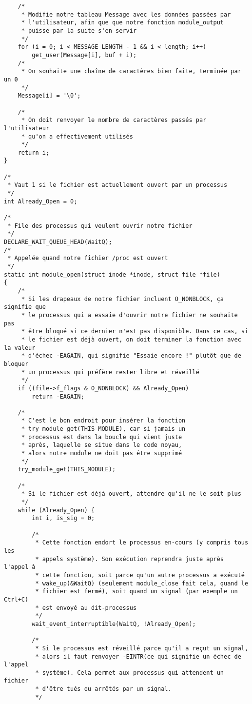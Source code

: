 \documentclass[11pt]{article}
\begin{document}
\begin{verbatim}
    /*
     * Modifie notre tableau Message avec les données passées par
     * l'utilisateur, afin que que notre fonction module_output
     * puisse par la suite s'en servir
     */
    for (i = 0; i < MESSAGE_LENGTH - 1 && i < length; i++)
        get_user(Message[i], buf + i);
    /*
     * On souhaite une chaîne de caractères bien faite, terminée par un 0
     */
    Message[i] = '\0';

    /*
     * On doit renvoyer le nombre de caractères passés par l'utilisateur
     * qu'on a effectivement utilisés
     */
    return i;
}

/*
 * Vaut 1 si le fichier est actuellement ouvert par un processus
 */
int Already_Open = 0;

/*
 * File des processus qui veulent ouvrir notre fichier
 */
DECLARE_WAIT_QUEUE_HEAD(WaitQ);
/*
 * Appelée quand notre fichier /proc est ouvert
 */
static int module_open(struct inode *inode, struct file *file)
{
    /*
     * Si les drapeaux de notre fichier incluent O_NONBLOCK, ça signifie que
     * le processus qui a essaie d'ouvrir notre fichier ne souhaite pas
     * être bloqué si ce dernier n'est pas disponible. Dans ce cas, si
     * le fichier est déjà ouvert, on doit terminer la fonction avec la valeur
     * d'échec -EAGAIN, qui signifie "Essaie encore !" plutôt que de bloquer
     * un processus qui préfère rester libre et réveillé
     */
    if ((file->f_flags & O_NONBLOCK) && Already_Open)
        return -EAGAIN;

    /*
     * C'est le bon endroit pour insérer la fonction
     * try_module_get(THIS_MODULE), car si jamais un
     * processus est dans la boucle qui vient juste
     * après, laquelle se situe dans le code noyau,
     * alors notre module ne doit pas être supprimé
     */
    try_module_get(THIS_MODULE);

    /*
     * Si le fichier est déjà ouvert, attendre qu'il ne le soit plus
     */
    while (Already_Open) {
        int i, is_sig = 0;

        /*
         * Cette fonction endort le processus en-cours (y compris tous les
         * appels système). Son exécution reprendra juste après l'appel à
         * cette fonction, soit parce qu'un autre processus a exécuté
         * wake_up(&WaitQ) (seulement module_close fait cela, quand le
         * fichier est fermé), soit quand un signal (par exemple un Ctrl+C)
         * est envoyé au dit-processus
         */
        wait_event_interruptible(WaitQ, !Already_Open);

        /*
         * Si le processus est réveillé parce qu'il a reçut un signal,
         * alors il faut renvoyer -EINTR(ce qui signifie un échec de l'appel
         * système). Cela permet aux processus qui attendent un fichier
         * d'être tués ou arrêtés par un signal.
         */


\end{verbatim}
\end{document}
